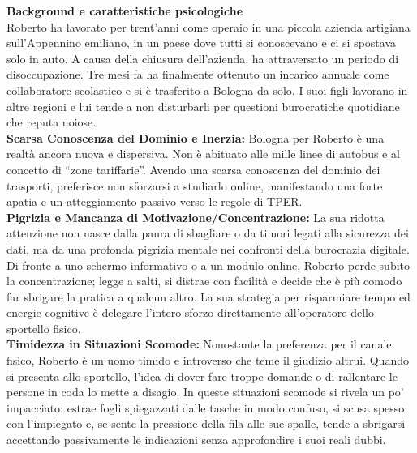 \documentclass[11pt,a4paper]{article}
\begin{document}

\begin{tcolorbox}[colback=backgroundColor,colframe=borderColor,arc=2mm]
    \textbf{Background e caratteristiche psicologiche} \\[4pt]
    {\small
    Roberto ha lavorato per trent'anni come operaio in una piccola azienda artigiana sull'Appennino emiliano, in un paese dove tutti si conoscevano e ci si spostava solo in auto. A causa della chiusura dell'azienda, ha attraversato un periodo di disoccupazione. Tre mesi fa ha finalmente ottenuto un incarico annuale come collaboratore scolastico e si è trasferito a Bologna da solo. I suoi figli lavorano in altre regioni e lui tende a non disturbarli per questioni burocratiche quotidiane che reputa noiose. \\[4pt]

    \textbf{Scarsa Conoscenza del Dominio e Inerzia:} Bologna per Roberto è una realtà ancora nuova e dispersiva. Non è abituato alle mille linee di autobus e al concetto di ``zone tariffarie''. Avendo una scarsa conoscenza del dominio dei trasporti, preferisce non sforzarsi a studiarlo online, manifestando una forte apatia e un atteggiamento passivo verso le regole di TPER. \\[4pt]

    \textbf{Pigrizia e Mancanza di Motivazione/Concentrazione:} La sua ridotta attenzione non nasce dalla paura di sbagliare o da timori legati alla sicurezza dei dati, ma da una profonda pigrizia mentale nei confronti della burocrazia digitale. Di fronte a uno schermo informativo o a un modulo online, Roberto perde subito la concentrazione; legge a salti, si distrae con facilità e decide che è più comodo far sbrigare la pratica a qualcun altro. La sua strategia per risparmiare tempo ed energie cognitive è delegare l'intero sforzo direttamente all'operatore dello sportello fisico. \\[4pt]

    \textbf{Timidezza in Situazioni Scomode:} Nonostante la preferenza per il canale fisico, Roberto è un uomo timido e introverso che teme il giudizio altrui. Quando si presenta allo sportello, l'idea di dover fare troppe domande o di rallentare le persone in coda lo mette a disagio. In queste situazioni scomode si rivela un po' impacciato: estrae fogli spiegazzati dalle tasche in modo confuso, si scusa spesso con l'impiegato e, se sente la pressione della fila alle sue spalle, tende a sbrigarsi accettando passivamente le indicazioni senza approfondire i suoi reali dubbi.
    }
\end{tcolorbox}
\end{document}
